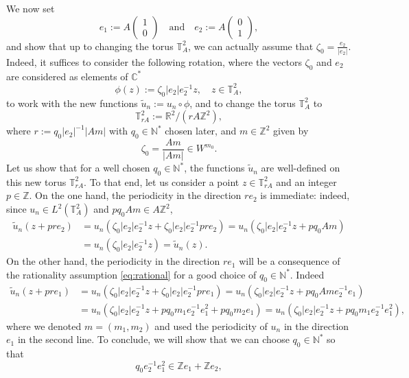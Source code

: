 \documentclass[a4paper,11pt]{amsart}
\numberwithin{equation}{section}
\theoremstyle{definition}
\newcommand{\twotorus}{\mathbb T^2_A}
\begin{document}
We now set
\[
    e_1 := {A\begin{pmatrix}
        1 \\
        0
    \end{pmatrix}}
    \quad\text{and}\quad
   e_2 := {A\begin{pmatrix}
        0 \\
        1
    \end{pmatrix}},
\]
and show that up to changing the torus $\twotorus$, we can actually assume that $\zeta_0= \frac{e_2}{|e_2|}$. Indeed, it suffices to consider the following rotation, where the vectors $\zeta_0$ and $e_2$ are considered as elements of $\mathbb C^*$
\[
    \phi(z) := \zeta_0 |e_2|e_2^{-1}z,\quad z\in\twotorus,
\]
to work with the new functions $\widetilde u_n := u_n\circ\phi$, and  to change the torus $\twotorus$ to
\[
    \mathbb T^2_{rA} := \mathbb R^2/(rA\mathbb Z^2),
\]
where $r := q_0 |e_2|^{-1}\vert Am\vert$ with $q_0 \in \mathbb N^*$ chosen later, and $m\in\mathbb Z^2$ given by
\[ 
    \zeta_0 = \frac{Am}{\vert Am\vert}\in W^{m_0}.
\]
 Let us show that for a well chosen $q_0 \in \mathbb N^*$, the functions $\widetilde u_n$ are well-defined on this new torus $\mathbb T^2_{rA}$. To that end, let us consider a point $z\in\mathbb T^2_{rA}$ and an integer $p\in\mathbb Z$. On the one hand, the periodicity in the direction $re_2$ is immediate: indeed, since $u_n\in L^2(\twotorus)$ and $pq_0 Am \in A\mathbb Z^2$,
\begin{align*}
    \widetilde u_n(z + pre_2) & = u_n(\zeta_0 |e_2|e_2^{-1}z + \zeta_0 |e_2|e_2^{-1}pre_2)
    = u_n(\zeta_0 |e_2|e_2^{-1}z + pq_0Am) \\[5pt]
    & = u_n(\zeta_0 |e_2|e_2^{-1}z) = \widetilde u_n(z).
\end{align*}
On the other hand, the periodicity in the direction $re_1$ will be a consequence of the rationality assumption \eqref{eq:rational} for a good choice of $q_0 \in \mathbb N^*$. Indeed
\begin{align*}
 \widetilde u_n(z + pre_1) &=   u_n(\zeta_0 |e_2|e_2^{-1}z + \zeta_0 |e_2|e_2^{-1}pre_1) = u_n(\zeta_0 |e_2|e_2^{-1}z + pq_0 Am e_2^{-1}e_1) \\[5pt]
 &= u_n(\zeta_0 |e_2|e_2^{-1}z + pq_0 m_1 e_2^{-1}e_1^2 + pq_0 m_2 e_1) =  u_n(\zeta_0 |e_2|e_2^{-1}z + pq_0 m_1 e_2^{-1}e_1^2),
\end{align*}
where we denoted $m=(m_1,m_2)$ and used the periodicity of $u_n$ in the direction $e_1$ in the second line. To conclude, we will show that we can choose $q_0 \in \mathbb N^*$ so that
\begin{equation} \label{eq:rat_rot}
q_0 e_2 ^{-1} e_1^2 \in \mathbb Z e_1 + \mathbb Z e_2,
\end{equation}
\end{document}
